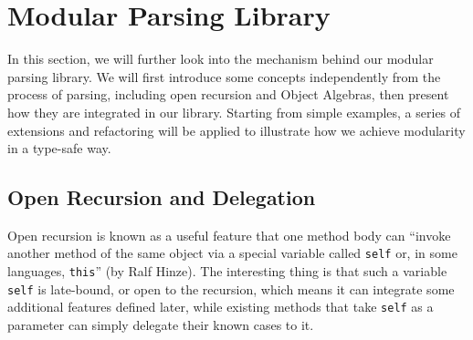 \section{Modular Parsing Library}\label{sec:library}


In this section, we will further look into the mechanism behind our modular parsing library.
We will first introduce some concepts independently from the process of parsing, including open recursion and Object Algebras,
then present how they are integrated in our library.
Starting from simple examples, a series of extensions and refactoring will be applied to illustrate
how we achieve modularity in a type-safe way.

\subsection{Open Recursion and Delegation}\label{subsec:openrecursion}

Open recursion is known as a useful feature that one method body can ``invoke another method of the same object via a special variable called \lstinline{self} or, in some languages, \lstinline[keywords={}]{this}'' (by Ralf Hinze). The interesting thing is that such a variable \lstinline{self} is late-bound, or open to the recursion, which means it can integrate some additional features defined later, while existing methods that take \lstinline{self} as a parameter can simply delegate their known cases to it.

